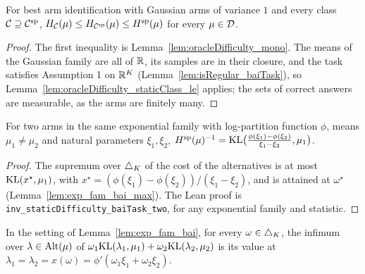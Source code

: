 \begin{lemma}
  \label{lem:gaussian_bai_oracle_le}
  \leanok
  For best arm identification with Gaussian arms of variance $1$ and every class $\mathcal{C} \supseteq
  \mathcal{C}^{\mathrm{sp}}$, $H_{\mathcal{C}}(\mu) \le H_{\mathcal{C}^{\mathrm{sp}}}(\mu) \le H^{\mathrm{sp}}(\mu)$ for every $\mu \in \mathcal{D}$.
\end{lemma}

\begin{proof}
  \leanok
  The first inequality is Lemma~\ref{lem:oracleDifficulty_mono}. The means of the Gaussian family
  are all of $\mathbb{R}$, its samples are in their closure, and the task satisfies Assumption 1 on
  $\mathbb{R}^K$ (Lemma~\ref{lem:isRegular_baiTask}), so Lemma~\ref{lem:oracleDifficulty_staticClass_le}
  applies; the sets of correct answers are measurable, as the arms are finitely many.
\end{proof}

\begin{lemma}[{\cite[Lemma 19]{D23}}]
  \label{lem:exp_fam_bai}
  \leanok
  For two arms in the same exponential family with log-partition function $\phi$, means $\mu_1 \ne
  \mu_2$ and natural parameters $\xi_1, \xi_2$,
  $H^{\mathrm{sp}}(\mu)^{-1} = \mathrm{KL}\bigl(\frac{\phi(\xi_1) - \phi(\xi_2)}{\xi_1 - \xi_2}, \mu_1\bigr)$.
\end{lemma}

\begin{proof}
  \leanok
  The supremum over $\triangle_K$ of the cost of the alternatives is at most
  $\mathrm{KL}(x^{\star}, \mu_1)$, with $x^{\star} = (\phi(\xi_1) - \phi(\xi_2)) / (\xi_1 - \xi_2)$, and is
  attained at $\omega^{\star}$ (Lemma~\ref{lem:exp_fam_bai_max}). The Lean proof is
  \texttt{inv\_staticDifficulty\_baiTask\_two}, for any exponential family and statistic.
\end{proof}

\begin{lemma}[{\cite[Lemma 19]{D23}}]
  \label{lem:exp_fam_bai_min}
  \leanok
  In the setting of Lemma~\ref{lem:exp_fam_bai}, for every $\omega \in \triangle_K$, the infimum
  over $\lambda \in \mathrm{Alt}(\mu)$ of $\omega_1 \mathrm{KL}(\lambda_1, \mu_1) + \omega_2 \mathrm{KL}(\lambda_2, \mu_2)$
  is its value at $\lambda_1 = \lambda_2 = x(\omega) = \phi'(\omega_1 \xi_1 + \omega_2 \xi_2)$.
\end{lemma}

